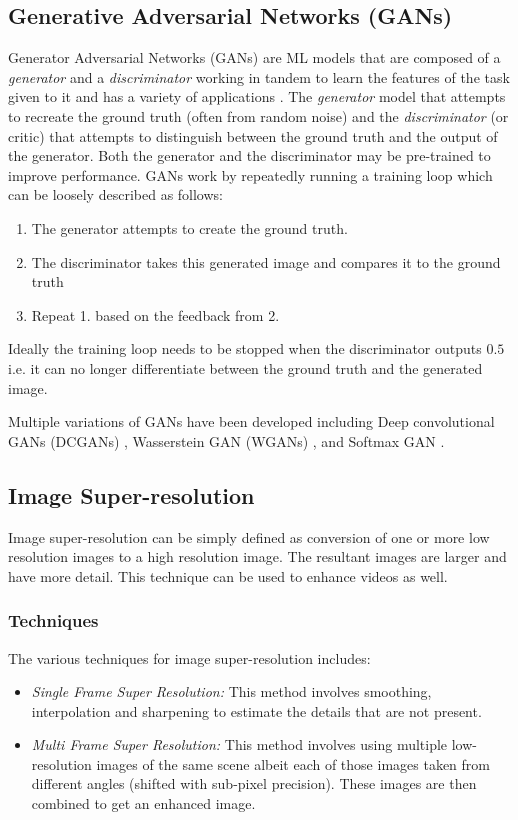 \documentclass[conference]{IEEEtran}
\begin{document}
		\subsection{Generative Adversarial Networks (GANs)}
			Generator Adversarial Networks (GANs) are ML models that are composed of a \emph{generator} and a \emph{discriminator} working in tandem to learn the features of the task given to it and has a variety of applications \cite{b2}. The \emph{generator} model that attempts to recreate the ground truth (often from random noise) and the \emph{discriminator} (or critic) that attempts to distinguish between the ground truth and the output of the generator. Both the generator and the discriminator may be pre-trained to improve performance. GANs work by repeatedly running a training loop which can be loosely described as follows:
			\begin{enumerate}
				\item The generator attempts to create the ground truth.
				\item The discriminator takes this generated image and compares it to the ground truth
				\item Repeat 1. based on the feedback from 2.
			\end{enumerate}
			Ideally the training loop needs to be stopped when the discriminator outputs $0.5$ i.e. it can no longer differentiate between the ground truth and the generated image.
			\par Multiple variations of GANs have been developed including Deep convolutional GANs (DCGANs) \cite{b3}, Wasserstein GAN (WGANs) \cite{b4}, and Softmax GAN \cite{b5}.
			
		\subsection{Image Super-resolution}
			Image super-resolution \cite{b6} can be simply defined as conversion of one or more low resolution images to a high resolution image. The resultant images are larger and have more detail. This technique can be used to enhance videos as well.
			
			\subsubsection{Techniques}
				The various techniques for image super-resolution includes:
				\begin{itemize}
					\item \textit{Single Frame Super Resolution:} This method involves smoothing, interpolation and sharpening to estimate the details that are not present.
					\item \textit{Multi Frame Super Resolution:} This method involves using multiple low-resolution images of the same scene albeit each of those images taken from different angles (shifted with sub-pixel precision). These images are then combined to get an enhanced image.
				\end{itemize}
			
\end{document}
